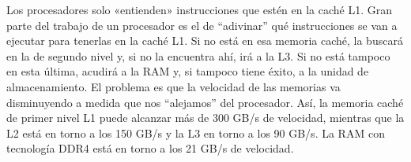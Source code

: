 \documentclass{article}
\begin{document}
Los procesadores solo «entienden» instrucciones que estén en la caché L1. Gran parte del trabajo de un procesador es el de “adivinar” qué instrucciones se van a ejecutar para tenerlas en la caché L1. Si no está en esa memoria caché, la buscará en la de segundo nivel y, si no la encuentra ahí, irá a la L3. Si no está tampoco en esta última, acudirá a la RAM y, si tampoco tiene éxito, a la unidad de almacenamiento.\newline
El problema es que la velocidad de las memorias va disminuyendo a medida que nos “alejamos” del procesador. Así, la memoria caché de primer nivel L1 puede alcanzar más de 300 GB/s de velocidad, mientras que la L2 está en torno a los 150 GB/s y la L3 en torno a los 90 GB/s. La RAM con tecnología DDR4 está en torno a los 21 GB/s de velocidad.\cite{Intel}



\end{document}
